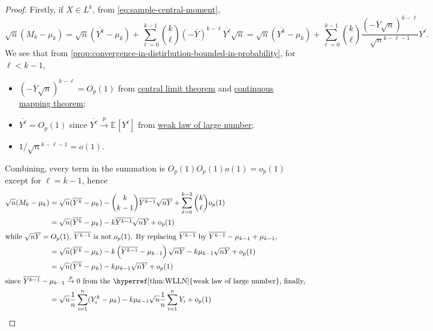 \begin{proof}
	Firstly, if \(X \in L^k\), from \autoref{eq:sample-central-moment},
	\[
		\sqrt{n} (M_k - \mu _k)
		= \sqrt{n} (\overline{Y^k} - \mu _k ) + \sum_{\ell =0}^{k-1} \binom{k}{\ell } (- \overline{Y} )^{k-\ell } \overline{Y^{\ell } } \sqrt{n}
		= \sqrt{n} (\overline{Y^k} - \mu _k ) + \sum_{\ell =0}^{k-1} \binom{k}{\ell } \frac{(- \overline{Y} \sqrt{n} )^{k-\ell }}{\sqrt{n} ^{k - \ell - 1}} \overline{Y^{\ell } }.
	\]
	We see that from \autoref{prop:convergence-in-distirbution-bounded-in-probability}, for \(\ell < k-1\),
	\begin{itemize}
		\item \((-\overline{Y} \sqrt{n})^{k - \ell } = O_p(1)\) from \hyperref[thm:CLT]{central limit theorem} and \hyperref[thm:continuous-mapping]{continuous mapping theorem};
		\item \(\overline{Y^{\ell } } = O_p(1)\) since \(\overline{Y^{\ell } } \overset{p}{\to} \mathbb{E}_{}[Y^{\ell } ]\) from \hyperref[thm:WLLN]{weak law of large number};
		\item \(1 / \sqrt{n} ^{k - \ell - 1} = o(1)\).
	\end{itemize}
	Combining, every term in the summation is \(O_p(1) O_p(1) o(1) = o_p(1)\) except for \(\ell = k-1\), hence
	\begin{align*}
		\sqrt{n} (M_k - \mu _k)
		 & = \sqrt{n} (\overline{Y^k} - \mu _k) - \binom{k}{k-1} \overline{Y^{k-1}} \sqrt{n} \overline{Y} + \sum_{\ell =0}^{k-2} \binom{k}{\ell } o_p(1)               \\
		 & = \sqrt{n} (\overline{Y^k} - \mu _k) - k \overline{Y^{k-1}} \sqrt{n} \overline{Y} + o_p(1)                                                                  \\
		\shortintertext{while \(\sqrt{n} \overline{Y} = O_p(1)\), \(\overline{Y^{k-1}} \) is not \(o_p(1)\). By replacing \(\overline{Y^{k-1} } \) by \(\overline{Y^{k-1}} - \mu _{k-1} + \mu _{k-1}\),}
		 & = \sqrt{n} (\overline{Y^k} - \mu _k) - k \left( \overline{Y^{k-1}} - \mu _{k-1} \right) \sqrt{n} \overline{Y} - k \mu _{k-1} \sqrt{n} \overline{Y} + o_p(1) \\
		 & = \sqrt{n} (\overline{Y^k} - \mu _k) - k \mu _{k-1} \sqrt{n} \overline{Y} + o_p(1)                                                                          \\
		\shortintertext{since \(\overline{Y^{k-1}} - \mu _{k-1} \overset{p}{\to} 0\) from the \hyperref[thm:WLLN]{weak law of large number}, finally,}
		 & =\sqrt{n} \frac{1}{n} \sum_{i=1}^{n} (Y_i^k - \mu _k) - k \mu _{k-1} \sqrt{n} \frac{1}{n}\sum_{i=1}^{n} Y_i  + o_p(1)                                       \\

\end{align*}
\end{proof}
